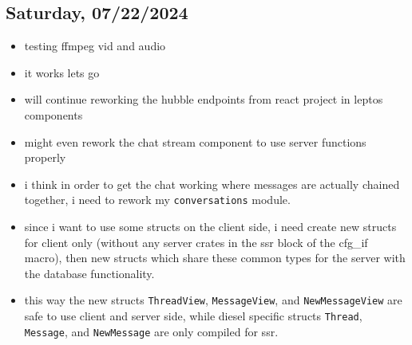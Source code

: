 \subsection*{Saturday, 07/22/2024}
\begin{itemize}
    \item testing ffmpeg vid and audio
    \item it works lets go
    \item will continue reworking the hubble endpoints from react project in
        leptos components
    \item might even rework the chat stream component to use server functions
        properly
    \item i think in order to get the chat working where messages are actually
        chained together, i need to rework my \texttt{conversations} module.
    \item since i want to use some structs on the client side, i need create new
        structs for client only (without any server crates in the ssr block of
        the cfg_if macro), then new structs which share these common types for
        the server with the database functionality.
    \item this way the new structs \texttt{ThreadView}, \texttt{MessageView},
        and \texttt{NewMessageView} are safe to use client and server side,
        while diesel specific structs \texttt{Thread}, \texttt{Message}, and
        \texttt{NewMessage} are only compiled for ssr.
\end{itemize}

